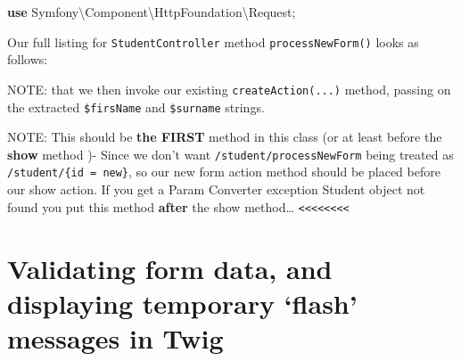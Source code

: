\documentclass[a4paperpaper,openright]{book}
\newenvironment{Shaded}{}{}
\newcommand{\AnnotationTok}[1]{\textcolor[rgb]{0.38,0.63,0.69}{\textbf{\textit{#1}}}}
\newcommand{\CommentTok}[1]{\textcolor[rgb]{0.38,0.63,0.69}{\textit{#1}}}
\newcommand{\KeywordTok}[1]{\textcolor[rgb]{0.00,0.44,0.13}{\textbf{#1}}}
\newcommand{\NormalTok}[1]{#1}
\newcommand{\OtherTok}[1]{\textcolor[rgb]{0.00,0.44,0.13}{#1}}
\newcommand{\StringTok}[1]{\textcolor[rgb]{0.25,0.44,0.63}{#1}}
\begin{document}
\begin{Shaded}
\begin{Highlighting}[]
    \KeywordTok{use}\NormalTok{ Symfony\textbackslash{}Component\textbackslash{}HttpFoundation\textbackslash{}Request}\OtherTok{;}
\end{Highlighting}
\end{Shaded}

Our full listing for \texttt{StudentController} method
\texttt{processNewForm()} looks as follows:

\begin{Shaded}
\end{Shaded}

NOTE: that we then invoke our existing \texttt{createAction(...)}
method, passing on the extracted \texttt{\$firsName} and
\texttt{\$surname} strings.

NOTE: This should be \textbf{the FIRST} method in this class (or at
least before the \textbf{show} method )- Since we don't want
\texttt{/student/processNewForm} being treated as
\texttt{/student/\{id\ =\ \textquotesingle{}new\textquotesingle{}\}}, so
our new form action method should be placed before our show action. If
you get a Param Converter exception Student object not found you put
this method \textbf{after} the show method\ldots{}
\texttt{\textless{}\textless{}\textless{}\textless{}\textless{}\textless{}\textless{}\textless{}}

\hypertarget{validating-form-data-and-displaying-temporary-flash-messages-in-twig}{%
\section{Validating form data, and displaying temporary `flash' messages
in
Twig}\label{validating-form-data-and-displaying-temporary-flash-messages-in-twig}}
\end{document}
